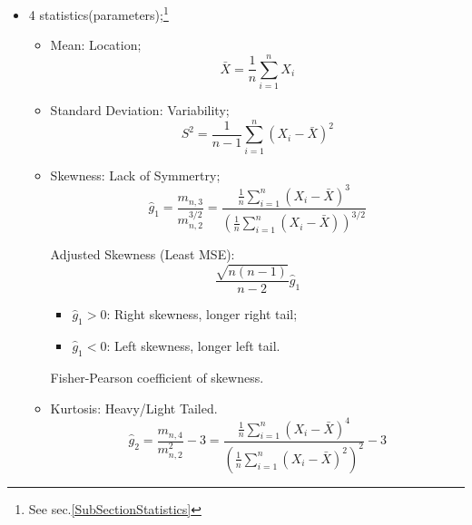     \begin{itemize}[topsep=2pt,itemsep=2pt]
        \item 4 statistics(parameters);\footnote{See sec.\ref{SubSectionStatistics}}
        \begin{itemize}[topsep=2pt,itemsep=2pt]
            \item Mean: Location;
            \begin{equation}
                \bar{X}=\dfrac{1}{n}\sum_{i=1}^nX_i 
            \end{equation}
            \item Standard Deviation: Variability;
            \begin{equation}
                S^2=\dfrac{1}{n-1}\sum_{i=1}^n(X_i-\bar{X}) ^2
            \end{equation}
            
            
            \item Skewness: Lack of Symmertry;
            \begin{equation}
                \hat{g}_1=\dfrac{m_{n,3}}{m_{n,2}^{3/2}}=\dfrac{\frac{1}{n}\sum\limits_{i=1}^n(X_i-\bar{X})^3}{\left( \frac{1}{n}\sum\limits_{i=1}^n(X_i-\bar{X}) \right)^{3/2}} 
            \end{equation}

            Adjusted Skewness (Least MSE):
            \begin{equation}
                \dfrac{\sqrt{n(n-1)}}{n-2}\hat{g}_1 
            \end{equation}
            
            \begin{itemize}[topsep=2pt,itemsep=2pt]
                \item $ \hat{g}_1>0 $: Right skewness, longer right tail;
                \item $ \hat{g}_1<0 $: Left skewness, longer left tail.
            \end{itemize}
            
                
            Fisher-Pearson coefficient of skewness.


            \item Kurtosis: Heavy/Light Tailed.
            \begin{equation}
                \hat{g}_2=\dfrac{m_{n,4}}{m_{n,2}^2}-3= \dfrac{\frac{1}{n}\sum\limits_{i=1}^n(X_i-\bar{X})^4}{\left( \frac{1}{n}\sum\limits_{i=1}^n(X_i-\bar{X})^2 \right)^{2}} -3
            \end{equation}


\end{itemize}
\end{itemize}
